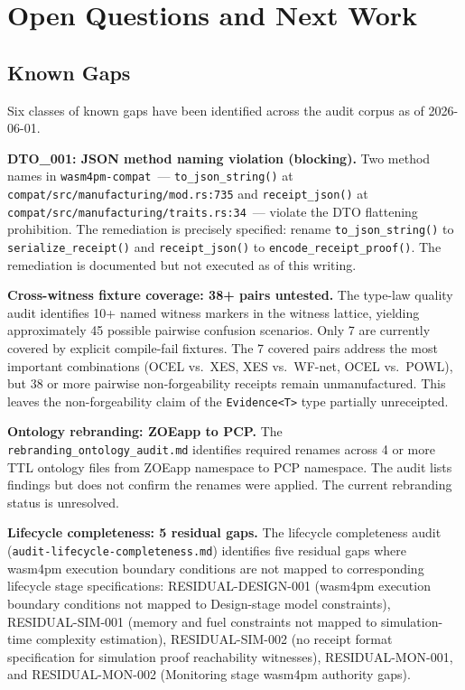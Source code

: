 
\section{Open Questions and Next Work}
\label{sec:audits-open}

\subsection{Known Gaps}
\label{sec:audits-open-gaps}

Six classes of known gaps have been identified across the audit corpus as of
2026-06-01.

\textbf{DTO\_001: JSON method naming violation (blocking).} Two method names in
\texttt{wasm4pm-compat}~--- \texttt{to\_json\_string()} at
\texttt{compat/src/manufacturing/mod.rs:735} and \texttt{receipt\_json()} at
\texttt{compat/src/manufacturing/traits.rs:34}~--- violate the DTO flattening
prohibition. The remediation is precisely specified: rename
\texttt{to\_json\_string()} to \texttt{serialize\_receipt()} and
\texttt{receipt\_json()} to \texttt{encode\_receipt\_proof()}. The remediation is
documented but not executed as of this writing.

\textbf{Cross-witness fixture coverage: 38+ pairs untested.} The type-law quality
audit identifies 10+ named witness markers in the witness lattice, yielding
approximately 45 possible pairwise confusion scenarios. Only 7 are currently
covered by explicit compile-fail fixtures. The 7 covered pairs address the most
important combinations (OCEL vs.\ XES, XES vs.\ WF-net, OCEL vs.\ POWL), but 38
or more pairwise non-forgeability receipts remain unmanufactured. This leaves the
non-forgeability claim of the \texttt{Evidence<T>} type partially unreceipted.

\textbf{Ontology rebranding: ZOEapp to PCP.} The \texttt{rebranding\_ontology\_audit.md}
identifies required renames across 4 or more TTL ontology files from ZOEapp
namespace to PCP namespace. The audit lists findings but does not confirm the
renames were applied. The current rebranding status is unresolved.

\textbf{Lifecycle completeness: 5 residual gaps.} The lifecycle completeness
audit (\texttt{audit-lifecycle-completeness.md}) identifies five residual gaps
where wasm4pm execution boundary conditions are not mapped to corresponding
lifecycle stage specifications: RESIDUAL-DESIGN-001 (wasm4pm execution boundary
conditions not mapped to Design-stage model constraints), RESIDUAL-SIM-001
(memory and fuel constraints not mapped to simulation-time complexity estimation),
RESIDUAL-SIM-002 (no receipt format specification for simulation proof
reachability witnesses), RESIDUAL-MON-001, and RESIDUAL-MON-002 (Monitoring
stage wasm4pm authority gaps).

